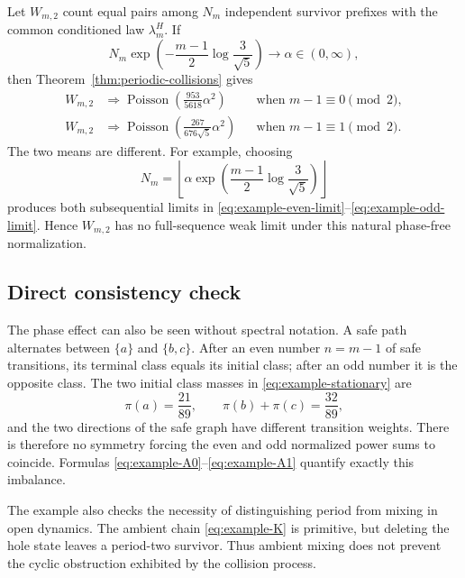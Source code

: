 Let \(W_{m,2}\) count equal pairs among \(N_m\) independent survivor
prefixes with the common conditioned law \(\lambda_m^H\).  If
\[
  N_m\exp\left(-\frac{m-1}{2}\log\frac3{\sqrt5}\right)
  \longrightarrow\alpha\in(0,\infty),
\]
then Theorem~\ref{thm:periodic-collisions} gives
\begin{align}
  W_{m,2}
  &\Rightarrow
  \operatorname{Poisson}\!\left(
      \frac{953}{5618}\alpha^2
  \right)
  &&\text{when }m-1\equiv0\pmod2,
  \label{eq:example-even-limit}\\
  W_{m,2}
  &\Rightarrow
  \operatorname{Poisson}\!\left(
      \frac{267}{676\sqrt5}\alpha^2
  \right)
  &&\text{when }m-1\equiv1\pmod2.
  \label{eq:example-odd-limit}
\end{align}
The two means are different.  For example, choosing
\[
  N_m=\left\lfloor
    \alpha\exp\left(\frac{m-1}{2}\log\frac3{\sqrt5}\right)
  \right\rfloor
\]
produces both subsequential limits in
\eqref{eq:example-even-limit}--\eqref{eq:example-odd-limit}.  Hence
\(W_{m,2}\) has no full-sequence weak limit under this natural
phase-free normalization.

\subsection{Direct consistency check}

The phase effect can also be seen without spectral notation.  A safe
path alternates between \(\{a\}\) and \(\{b,c\}\).  After an even
number \(n=m-1\) of safe transitions, its terminal class equals its
initial class; after an odd number it is the opposite class.  The two
initial class masses in \eqref{eq:example-stationary} are
\[
  \pi(a)=\frac{21}{89},
  \qquad
  \pi(b)+\pi(c)=\frac{32}{89},
\]
and the two directions of the safe graph have different transition
weights.  There is therefore no symmetry forcing the even and odd
normalized power sums to coincide.  Formulas
\eqref{eq:example-A0}--\eqref{eq:example-A1} quantify exactly this
imbalance.

The example also checks the necessity of distinguishing period from
mixing in open dynamics.  The ambient chain \eqref{eq:example-K} is
primitive, but deleting the hole state leaves a period-two survivor.
Thus ambient mixing does not prevent the cyclic obstruction exhibited
by the collision process.
